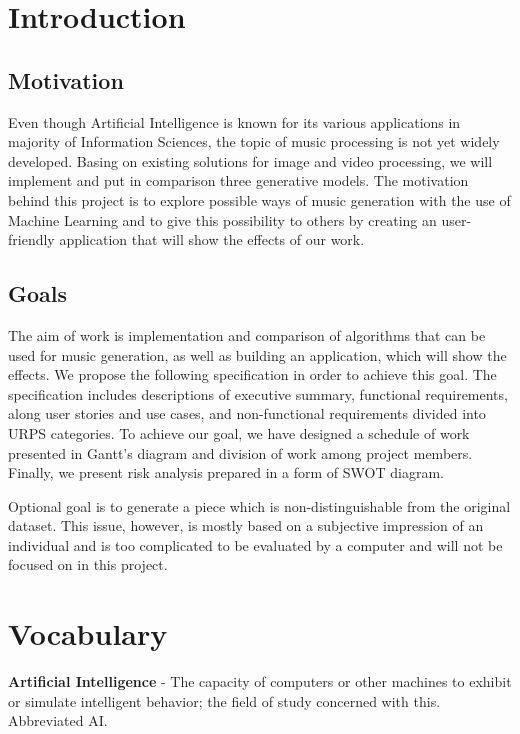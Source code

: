\documentclass{article}
\begin{document}
\newpage


\tableofcontents
\newpage

\section{Introduction}
\subsection{Motivation}
Even though Artificial Intelligence is known for its various applications in majority of Information Sciences, the topic of music processing is not yet widely developed. Basing on existing solutions for image and video processing, we will implement and put in comparison three generative models. The motivation behind this project is to explore possible ways of music generation with the use of Machine Learning and to give this possibility to others by creating an user-friendly application that will show the effects of our work.

\subsection{Goals}

The aim of work is implementation and comparison of algorithms that can be used for music generation, as well as building an application, which will show the effects. We propose the following specification in order to achieve this goal. The specification includes descriptions of executive summary, functional requirements, along user stories and use cases, and non-functional requirements divided into URPS categories. To achieve our goal, we have designed a schedule of work presented in Gantt's diagram and division of work among project members. Finally, we present risk analysis prepared in a form of SWOT diagram.

\noindent
Optional goal is to generate a piece which is non-distinguishable from the original dataset. This issue, however, is mostly based on a subjective impression of an individual and is too complicated to be evaluated by a computer and will not be focused on in this project.

\section{Vocabulary}
\textbf{Artificial Intelligence} - The capacity of computers or other machines to exhibit or simulate intelligent behavior; the field of study concerned with this. Abbreviated AI. \cite{AI_OED}
\end{document}
